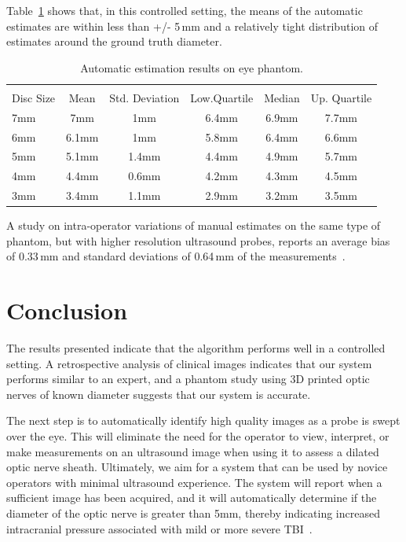 \documentclass{llncs}
\begin{document}
Table~\ref{tab:phantom} shows that, in this controlled setting, the means of the
automatic estimates are within less than +/- 5\,mm and a relatively tight
distribution of estimates around the ground truth diameter. 
\begin{table}[bht]
\centering
\caption{
Automatic estimation results on eye phantom.
}
\label{tab:phantom}
\begin{tabular}{l|cc|ccc}
\\[-2.8ex] 
\hline  
\hline 
\\[-1.8ex]
Disc Size & Mean & Std. Deviation & Low.Quartile & Median & Up. Quartile \\
\hline
7mm & 7mm   & 1mm   & 6.4mm & 6.9mm & 7.7mm \\
6mm & 6.1mm & 1mm   & 5.8mm & 6.4mm & 6.6mm \\
5mm & 5.1mm & 1.4mm & 4.4mm & 4.9mm & 5.7mm \\
4mm & 4.4mm & 0.6mm & 4.2mm & 4.3mm & 4.5mm \\
3mm & 3.4mm & 1.1mm & 2.9mm & 3.2mm & 3.5mm \\
\hline 
\end{tabular}
\end{table}
A study on intra-operator variations of manual estimates on the same type of
phantom, but with higher resolution ultrasound probes, reports an average bias
of 0.33\,mm and standard deviations of 0.64\,mm of the
measurements~\cite{Jo2016}.  


\section{Conclusion}
The results presented indicate that the algorithm performs well in a controlled
setting.  A retrospective analysis of clinical images indicates that our system
performs similar to an expert, and a phantom study using 3D printed optic
nerves of known diameter suggests that our system is accurate.

The next step is to automatically identify high quality images as a probe is
swept over the eye. This will eliminate the need for the operator to view,
interpret, or make measurements on an ultrasound image when using it to assess
a dilated optic nerve sheath. Ultimately, we aim for a system that can be used
by novice operators with minimal ultrasound experience. The system will report
when a sufficient image has been acquired, and it will automatically determine
if the diameter of the optic nerve is greater than 5mm, thereby indicating
increased intracranial pressure associated with mild or more severe
TBI~\cite{Ma2015}.
\end{document}
